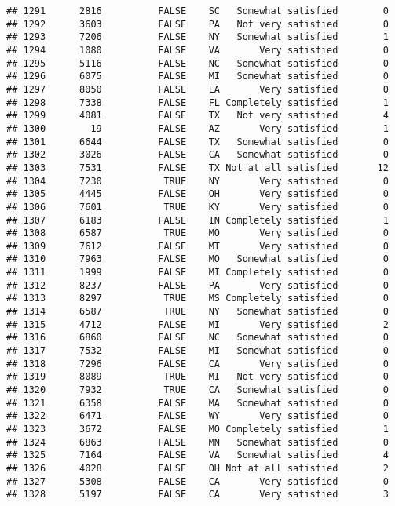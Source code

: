 \documentclass[]{book}
\theoremstyle{definition}
\theoremstyle{definition}
\theoremstyle{remark}
\begin{document}
\begin{verbatim}
## 1291      2816          FALSE    SC   Somewhat satisfied        0
## 1292      3603          FALSE    PA   Not very satisfied        0
## 1293      7206          FALSE    NY   Somewhat satisfied        1
## 1294      1080          FALSE    VA       Very satisfied        0
## 1295      5116          FALSE    NC   Somewhat satisfied        0
## 1296      6075          FALSE    MI   Somewhat satisfied        0
## 1297      8050          FALSE    LA       Very satisfied        0
## 1298      7338          FALSE    FL Completely satisfied        1
## 1299      4081          FALSE    TX   Not very satisfied        4
## 1300        19          FALSE    AZ       Very satisfied        1
## 1301      6644          FALSE    TX   Somewhat satisfied        0
## 1302      3026          FALSE    CA   Somewhat satisfied        0
## 1303      7531          FALSE    TX Not at all satisfied       12
## 1304      7230           TRUE    NY       Very satisfied        0
## 1305      4445          FALSE    OH       Very satisfied        0
## 1306      7601           TRUE    KY       Very satisfied        0
## 1307      6183          FALSE    IN Completely satisfied        1
## 1308      6587           TRUE    MO       Very satisfied        0
## 1309      7612          FALSE    MT       Very satisfied        0
## 1310      7963          FALSE    MO   Somewhat satisfied        0
## 1311      1999          FALSE    MI Completely satisfied        0
## 1312      8237          FALSE    PA       Very satisfied        0
## 1313      8297           TRUE    MS Completely satisfied        0
## 1314      6587           TRUE    NY   Somewhat satisfied        0
## 1315      4712          FALSE    MI       Very satisfied        2
## 1316      6860          FALSE    NC   Somewhat satisfied        0
## 1317      7532          FALSE    MI   Somewhat satisfied        0
## 1318      7296          FALSE    CA       Very satisfied        0
## 1319      8089           TRUE    MI   Not very satisfied        0
## 1320      7932           TRUE    CA   Somewhat satisfied        0
## 1321      6358          FALSE    MA   Somewhat satisfied        0
## 1322      6471          FALSE    WY       Very satisfied        0
## 1323      3672          FALSE    MO Completely satisfied        1
## 1324      6863          FALSE    MN   Somewhat satisfied        0
## 1325      7164          FALSE    VA   Somewhat satisfied        4
## 1326      4028          FALSE    OH Not at all satisfied        2
## 1327      5308          FALSE    CA       Very satisfied        0
## 1328      5197          FALSE    CA       Very satisfied        3

\end{verbatim}
\end{document}
